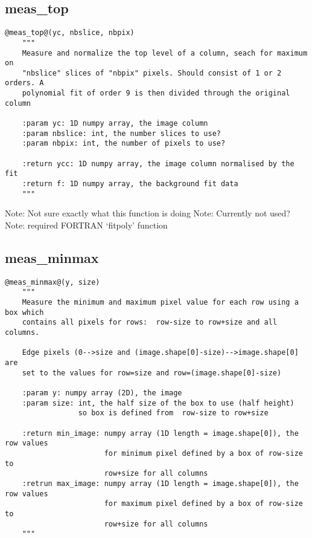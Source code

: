 \vspace{0.5cm}
\subsection{meas\_top}
\begin{lstlisting}[style=pythonstyle]
@meas_top@(yc, nbslice, nbpix)
    """
    Measure and normalize the top level of a column, seach for maximum on
    "nbslice" slices of "nbpix" pixels. Should consist of 1 or 2 orders. A 
    polynomial fit of order 9 is then divided through the original column

    :param yc: 1D numpy array, the image column
    :param nbslice: int, the number slices to use?
    :param nbpix: int, the number of pixels to use?
    
    :return ycc: 1D numpy array, the image column normalised by the fit
    :return f: 1D numpy array, the background fit data
    """
\end{lstlisting}

\noindent Note: Not sure exactly what this function is doing
\noindent Note: Currently not used?
\noindent Note: required FORTRAN `fitpoly' function

\vspace{0.5cm}
\subsection{meas\_minmax}
\begin{lstlisting}[style=pythonstyle]
@meas_minmax@(y, size)
    """
    Measure the minimum and maximum pixel value for each row using a box which
    contains all pixels for rows:  row-size to row+size and all columns.

    Edge pixels (0-->size and (image.shape[0]-size)-->image.shape[0] are
    set to the values for row=size and row=(image.shape[0]-size)

    :param y: numpy array (2D), the image
    :param size: int, the half size of the box to use (half height)
                 so box is defined from  row-size to row+size

    :return min_image: numpy array (1D length = image.shape[0]), the row values
                       for minimum pixel defined by a box of row-size to
                       row+size for all columns
    :retrun max_image: numpy array (1D length = image.shape[0]), the row values
                       for maximum pixel defined by a box of row-size to
                       row+size for all columns
    """
\end{lstlisting}


